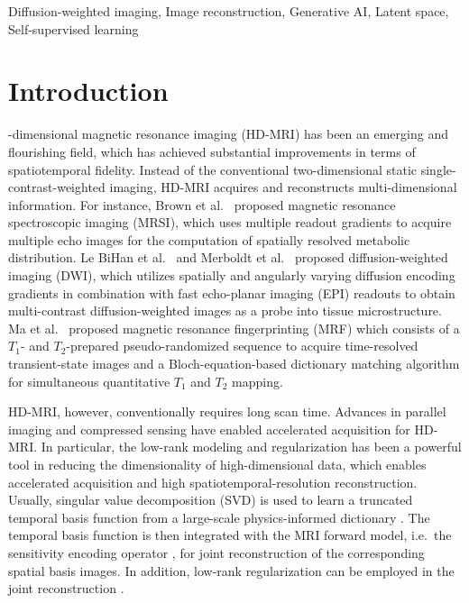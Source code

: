 \documentclass[journal,twoside,web]{ieeecolor}
\begin{document}
	\begin{IEEEkeywords}
	Diffusion-weighted imaging, Image reconstruction, Generative AI, Latent space, Self-supervised learning
	\end{IEEEkeywords}

	\section{Introduction}
	\label{SEC:INTRO}
	-dimensional magnetic resonance imaging (HD-MRI)
	has been an emerging and flourishing field,
	which has achieved substantial improvements in terms of spatiotemporal fidelity.
	Instead of the conventional two-dimensional static single-contrast-weighted imaging,
	HD-MRI acquires and reconstructs multi-dimensional information.
	For instance, Brown et al.~\cite{brown_1982_mrsi}
	proposed magnetic resonance spectroscopic imaging (MRSI),
	which uses multiple readout gradients to acquire multiple echo images
	for the computation of spatially resolved metabolic distribution.
	Le BiHan et al.~\cite{lebihan_1986_diff} and
	Merboldt et al.~\cite{merboldt_1985_diff} proposed
	diffusion-weighted imaging (DWI),
	which utilizes spatially and angularly varying
	diffusion encoding gradients in combination with
	fast echo-planar imaging (EPI) readouts \cite{mansfield_1977_epi}
	to obtain multi-contrast diffusion-weighted images
	as a probe into tissue microstructure.
	Ma et al.~\cite{ma_2013_mrf} proposed
	magnetic resonance fingerprinting (MRF)
	which consists of a $T_1$- and $T_2$-prepared pseudo-randomized sequence
	to acquire time-resolved transient-state images
	and a Bloch-equation-based dictionary matching algorithm \cite{doneva_2010_moba}
	for simultaneous quantitative $T_1$ and $T_2$ mapping.

	HD-MRI, however, conventionally requires long scan time.
	Advances in parallel imaging
	\cite{roemer_1990_pi,sodickson_1997_smash,
	pruessmann_1999_sense,pruessmann_2001_gsense,griswold_2002_grappa}
	and compressed sensing
	\cite{lustig_2007_cs,block_2007_cs,liang_2007_psf}
	have enabled accelerated acquisition for HD-MRI.
	In particular, the low-rank modeling and regularization \cite{cai_2010_svt}
	has been a powerful tool in reducing the dimensionality of high-dimensional data,
	which enables accelerated acquisition and high spatiotemporal-resolution reconstruction.
	Usually, singular value decomposition (SVD) is used to
	learn a truncated temporal basis function from
	a large-scale physics-informed dictionary
	\cite{huang_2012_t2basis,lam_2014_spice,mcgivney_2014_svdmrf}.
	The temporal basis function is then integrated
	with the MRI forward model,
	i.e.~the sensitivity encoding operator \cite{pruessmann_2001_gsense},
	for joint reconstruction of the corresponding spatial basis images.
	In addition, low-rank regularization can be employed in the joint reconstruction
	\cite{tamir_2017_t2shuffling}.
\end{document}
